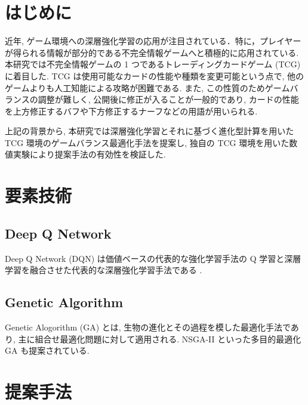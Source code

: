 \documentclass[twocolumn]{jarticle}     %
\begin{document}
  \noindent

  \section{はじめに}
  近年, ゲーム環境への深層強化学習の応用が注目されている．特に，プレイヤーが得られる情報が部分的である不完全情報ゲームへと積極的に応用されている.
  本研究では不完全情報ゲームの 1 つであるトレーディングカードゲーム (TCG) に着目した. TCG は使用可能なカードの性能や種類を変更可能という点で, 他のゲームよりも人工知能による攻略が困難である. また, この性質のためゲームバランスの調整が難しく, 公開後に修正が入ることが一般的であり, カードの性能を上方修正するバフや下方修正するナーフなどの用語が用いられる. \par
  上記の背景から, 本研究では深層強化学習とそれに基づく進化型計算を用いた TCG 環境のゲームバランス最適化手法を提案し, 独自の TCG 環境を用いた数値実験により提案手法の有効性を検証した. 

  \section{要素技術}
\subsection{Deep Q Network}
Deep Q Network (DQN) は価値ベースの代表的な強化学習手法の Q 学習と深層学習を融合させた代表的な深層強化学習手法である \cite{DQN}.
\subsection{Genetic Algorithm}
Genetic Alogorithm (GA) とは, 生物の進化とその過程を模した最適化手法であり, 主に組合せ最適化問題に対して適用される.  NSGA-II \cite{NSGA-2} といった多目的最適化 GA も提案されている.

\section{提案手法}
\end{document}
